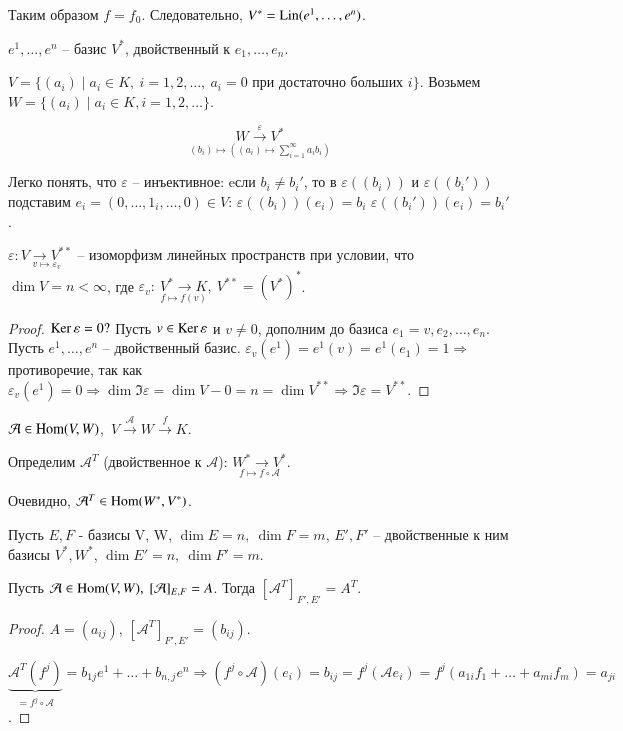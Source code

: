 \documentclass[main]{subfiles}
\begin{document}
Таким образом $f = f_0$. Следовательно, $V^* = \operatorname{Lin}(e^1,\dots,e^n)$.

$e^1, \ldots,e^n$ -- базис $V^*$, двойственный к $e_1,\dots, e_n$.
\begin{example}
    $V = \{(a_i) \mid a_i \in K, \ i = 1,2,\dots, \ a_i = 0 \text{ при достаточно больших } i \}$.
    Возьмем $W=\{(a_i) \mid a_i \in K, i = 1,2,\dots \}$.

    \[\underset{(b_i)\mapsto((a_i)\mapsto \sum_{i = 1}^{\infty}a_ib_i)}{W \overset{\varepsilon}{\longrightarrow} V^*}\]

    Легко понять, что $\varepsilon$ -- инъективное: eсли $b_i \neq b_i'$, то в $\varepsilon((b_i))$ и $\varepsilon((b_i'))$ подставим $e_i = (0, \ldots, 1_i, \ldots, 0) \in V$: $\varepsilon((b_i))(e_i) = b_i$ \neq $\varepsilon((b_i'))(e_i) = b_i'$.
\end{example}

\begin{proposition}
    $\varepsilon: \underset{v \mapsto \varepsilon_v}{V \to V^{**}}$ -- изоморфизм линейных пространств при условии,  что $\dim V=n < \infty$, где $\varepsilon_v: \ \underset{f \mapsto f(v)}{V^* \rightarrow K}, \
    V^{**} = (V^*)^*$.
\end{proposition}

\begin{proof}
    $\operatorname{Ker}\varepsilon = 0 ?$
    Пусть $v \in \operatorname{Ker}\varepsilon$ и $v \neq 0$, дополним до базиса $e_1=v, e_2,\dots,e_n$.
    Пусть $e^1,\dots, e^n$ -- двойственный базис.
    $\varepsilon_v(e^1)=e^1(v) = e^1(e_1) = 1 \Rightarrow$ противоречие, так как $\varepsilon_v(e^1) = 0
        \Rightarrow \dim \Im \varepsilon = \dim V - 0 = n = \dim V^{**} \Rightarrow \Im \varepsilon = V^{**}$.
\end{proof}

$\mathcal{A} \in \operatorname{Hom}(V,W)$,\ $V \overset{\mathcal{A}}{\to} W \overset{f}{\to} K$.

Определим $\mathcal{A}^T$ (двойственное к $\mathcal{A}$): $\underset{f \mapsto f \circ \mathcal{A}}{W^* \to V^*}$.

Очевидно, $\mathcal{A}^T \in \operatorname{Hom}(W^*,V^*)$.

\begin{proposition}
    Пусть $E,F$ - базисы V, W, $\dim E = n, \ \dim F = m$, $E', F'$ -- двойственные к ним базисы $V^*, W^*$, $\dim E' = n, \ \dim F' = m$.

    Пусть $\mca \in \Hom(V,W), \ [\mathcal{A}]_{E,F} = A$. Тогда $[\mathcal{A}^T]_{F',E'} = A^T$.
\end{proposition}

\begin{proof}
    $A = (a_{ij})$, $[\mathcal{A}^T]_{F',E'} = (b_{ij})$.

    $\underbrace{\mathcal{A}^T(f^j)}_{=f^j\circ \mathcal{A}} = b_{1j}e^1+\dots+b_{n,j}e^n \Rightarrow  (f^j \circ \mathcal{A})(e_i) = b_{ij} = f^j(\mathcal{A}e_i)=f^j(a_{1i}f_1+\dots+a_{mi}f_m)=a_{ji}$.
\end{proof}
\end{document}
